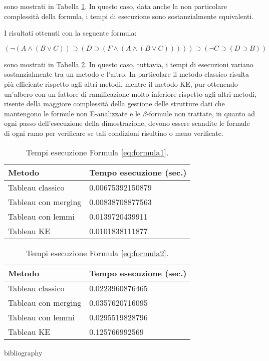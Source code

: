 \documentclass[12pt,a4paper]{article}
\theoremstyle{plain}
\theoremstyle{definition}
\theoremstyle{remark}
\begin{document}
sono mostrati in Tabella \ref{tab:tabella1}. In questo caso, data anche la non particolare
complessità della formula, i tempi di esecuzione sono sostanzialmente equivalenti. 

I risultati ottenuti con la seguente formula:

\begin{equation}
(\neg(A\land(B \lor C))\supset (D\supset (F\land (A\land (B\lor C)))))\supset(\neg C\supset (D\supset B))
\label{eq:formula2}
\end{equation}

sono mostrati in Tabella \ref{tab:tabella2}. In questo caso, tuttavia, i tempi di esecuzioni variano sostanzialmente
tra un metodo e l'altro. In particolare il metodo classico risulta più efficiente rispetto agli altri metodi, mentre
il metodo KE, pur ottenendo un'albero con un fattore di ramificazione molto inferiore rispetto agli altri metodi,
risente della maggiore complessità della gestione delle strutture dati che mantengono le formule non E-analizzate
e le $\beta$-formule non trattate, in quanto ad ogni passo dell'esecuzione della dimostrazione, devono essere scandite
le formule di ogni ramo per verificare se tali condizioni risultino o meno verificate.

\begin{table}[H]
\begin{center}
\begin{tabular}{l l}
\hline
Metodo & Tempo esecuzione (sec.) \\
\hline
Tableau classico & 0.00675392150879 \\
Tableau con merging & 0.00838708877563 \\
Tableau con lemmi & 0.0139720439911 \\
Tableau KE & 0.0101838111877 \\
\hline 
\end{tabular}
\end{center}
\caption{Tempi esecuzione Formula \eqref{eq:formula1}.}
\label{tab:tabella1}
\end{table}

\begin{table}[H]
\begin{center}
\begin{tabular}{l l}
\hline
Metodo & Tempo esecuzione (sec.) \\
\hline
Tableau classico & 0.0223960876465 \\
Tableau con merging & 0.0357620716095 \\
Tableau con lemmi & 0.0295519828796 \\
Tableau KE & 0.125766992569 \\
\hline 
\end{tabular}
\end{center}
\caption{Tempi esecuzione Formula \eqref{eq:formula2}.}
\label{tab:tabella2}
\end{table}

\begin{bibliography}{bibliography}

\end{bibliography}
\end{document}
